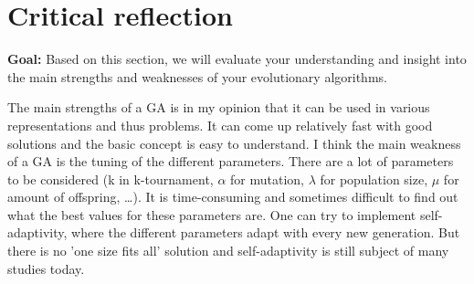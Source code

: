 \documentclass[a4paper,10pt]{article}
\newcommand{\ReplaceMe}[1]{{\color{blue}#1}}
\newcommand{\RemoveMe}[1]{{\color{purple}#1}}
\begin{document}
\section{Critical reflection}

\RemoveMe{\textbf{Goal:} Based on this section, we will evaluate your understanding and insight into the main strengths and weaknesses of your evolutionary algorithms.}

The main strengths of a GA is in my opinion that it can be used in various representations and thus problems. It can come up relatively fast with good solutions and the basic concept is easy to understand. 
I think the main weakness of a GA is the tuning of the different parameters. There are a lot of parameters to be considered (k in k-tournament, $\alpha$ for mutation, $\lambda$ for population size, $\mu$ for amount of offspring, \ldots). It is time-consuming and sometimes difficult to find out what the best values for these parameters are. One can try to implement self-adaptivity, where the different parameters adapt with every new generation. But there is no 'one size fits all' solution and self-adaptivity is still subject of many studies today.




\end{document}
